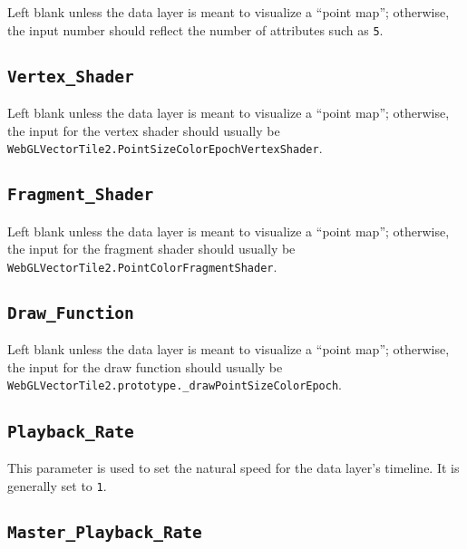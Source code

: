 \documentclass[
]{book}
\begin{document}
Left blank unless the data layer is meant to visualize a ``point map''; otherwise, the input number should reflect the number of attributes such as \texttt{5}.

\hypertarget{vertex_shader}{%
\subsection*{\texorpdfstring{\texttt{Vertex\_Shader}}{Vertex\_Shader}}\label{vertex_shader}}


Left blank unless the data layer is meant to visualize a ``point map''; otherwise, the input for the vertex shader should usually be \texttt{WebGLVectorTile2.PointSizeColorEpochVertexShader}.

\hypertarget{fragment_shader}{%
\subsection*{\texorpdfstring{\texttt{Fragment\_Shader}}{Fragment\_Shader}}\label{fragment_shader}}


Left blank unless the data layer is meant to visualize a ``point map''; otherwise, the input for the fragment shader should usually be \texttt{WebGLVectorTile2.PointColorFragmentShader}.

\hypertarget{draw_function}{%
\subsection*{\texorpdfstring{\texttt{Draw\_Function}}{Draw\_Function}}\label{draw_function}}


Left blank unless the data layer is meant to visualize a ``point map''; otherwise, the input for the draw function should usually be \texttt{WebGLVectorTile2.prototype.\_drawPointSizeColorEpoch}.

\hypertarget{playback_rate}{%
\subsection*{\texorpdfstring{\texttt{Playback\_Rate}}{Playback\_Rate}}\label{playback_rate}}


This parameter is used to set the natural speed for the data layer's timeline. It is generally set to \texttt{1}.

\hypertarget{master_playback_rate}{%
\subsection*{\texorpdfstring{\texttt{Master\_Playback\_Rate}}{Master\_Playback\_Rate}}\label{master_playback_rate}}
\end{document}
